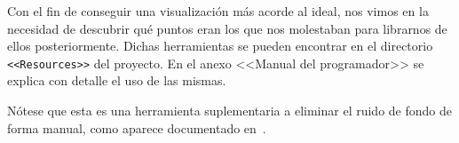 Con el fin de conseguir una visualización más acorde al ideal, nos vimos en la necesidad de descubrir qué puntos eran los que nos molestaban para librarnos de ellos posteriormente. Dichas herramientas se pueden encontrar en el directorio \texttt{<<Resources>>} del proyecto. En el anexo <<Manual del programador>> se explica con detalle el uso de las mismas.

Nótese que esta es una herramienta suplementaria a eliminar el ruido de fondo de forma manual, como aparece documentado en~\cite{wiki:removing-background-noise}.
